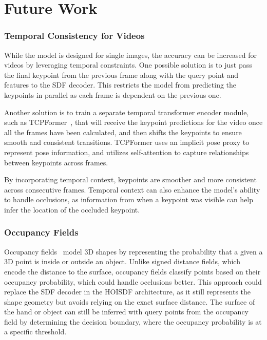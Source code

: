 \documentclass{article}
\begin{document}
\section*{Future Work}

\subsubsection*{Temporal Consistency for Videos}

While the model is designed for single images, the accuracy can be increased for videos by leveraging temporal constraints. One possible solution is to just pass the final keypoint from the previous frame along with the query point and features to the SDF decoder. This restricts the model from predicting the keypoints in parallel as each frame is dependent on the previous one.

Another solution is to train a separate temporal transformer encoder module, such as TCPFormer~\cite{liu2025tcpformer}, that will receive the keypoint predictions for the video once all the frames have been calculated, and then shifts the keypoints to ensure smooth and consistent transitions. TCPFormer uses an implicit pose proxy to represent pose information, and utilizes self-attention to capture relationships between keypoints across frames.

By incorporating temporal context, keypoints are smoother and more consistent across consecutive frames. Temporal context can also enhance the model's ability to handle occlusions, as information from when a keypoint was visible can help infer the location of the occluded keypoint.

\subsubsection*{Occupancy Fields}

Occupancy fields~\cite{li2024diffusionfof} model 3D shapes by representing the probability that a given a 3D point is inside or outside an object. Unlike signed distance fields, which encode the distance to the surface, occupancy fields classify points based on their occupancy probability, which could handle occlusions better. This approach could replace the SDF decoder in the HOISDF architecture, as it still represents the shape geometry but avoids relying on the exact surface distance. The surface of the hand or object can still be inferred with query points from the occupancy field by determining the decision boundary, where the occupancy probability is at a specific threshold.

\printbibliography[]
\end{document}
